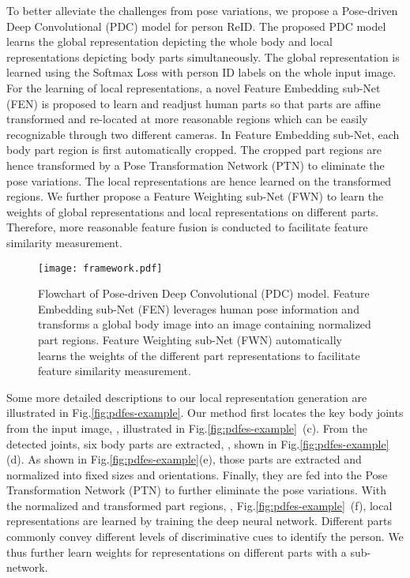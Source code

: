 \documentclass[10pt,twocolumn,letterpaper]{article}
\begin{document}
To better alleviate the challenges from pose variations, we propose a Pose-driven Deep Convolutional (PDC) model for person ReID. The proposed PDC model learns the global representation depicting the whole body and local representations depicting body parts simultaneously. The global representation is learned using the Softmax Loss with person ID labels on the whole input image. For the learning of local representations, a novel Feature Embedding sub-Net (FEN) is proposed to learn and readjust human parts so that parts are affine transformed and re-located at more reasonable regions which can be easily recognizable through two different cameras. In Feature Embedding sub-Net, each body part region is first automatically cropped. The cropped part regions are hence transformed by a Pose Transformation Network (PTN) to eliminate the pose variations. The local representations are hence learned on the transformed regions. We further propose a Feature Weighting sub-Net (FWN) to learn the weights of global representations and local representations on different parts. Therefore, more reasonable feature fusion is conducted to facilitate feature similarity measurement.


\begin{figure}
\centering \texttt{[image: framework.pdf]}\\
\vspace{-1mm}
\caption{Flowchart of Pose-driven Deep Convolutional (PDC) model. Feature Embedding sub-Net (FEN) leverages human pose information and transforms a global body image into an image containing normalized part regions. Feature Weighting sub-Net (FWN) automatically learns the weights of the different part representations to facilitate feature similarity measurement.}
\vspace{-4mm}
\label{fig:framewrok}
\end{figure}

Some more detailed descriptions to our local representation generation are illustrated in Fig.\ref{fig:pdfes-example}. Our method first locates the key body joints from the input image, \eg, illustrated in Fig.\ref{fig:pdfes-example}~(c). From the detected joints, six body parts are extracted, \eg, shown in Fig.\ref{fig:pdfes-example}(d). As shown in Fig.\ref{fig:pdfes-example}(e), those parts are extracted and normalized into fixed sizes and orientations. Finally, they are fed into the Pose Transformation Network (PTN) to further eliminate the pose variations. With the normalized and transformed part regions, \eg, Fig.\ref{fig:pdfes-example}~(f), local representations are learned by training the deep neural network. Different parts commonly convey different levels of discriminative cues to identify the person. We thus further learn weights for representations on different parts with a sub-network.
\end{document}
